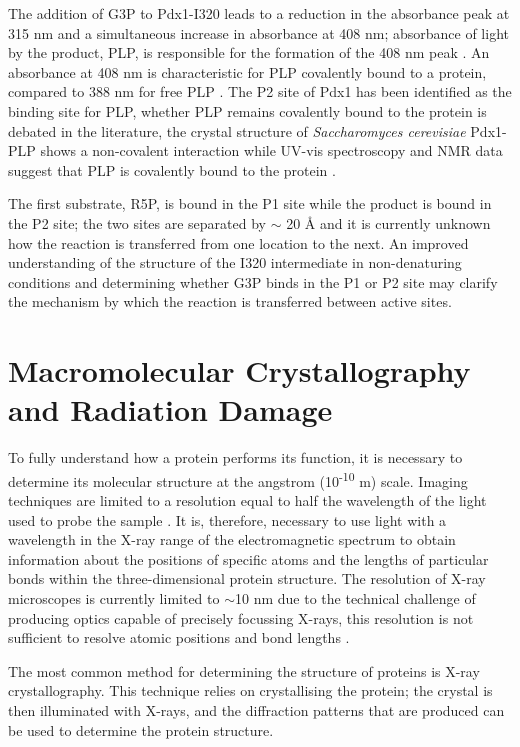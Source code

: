 The addition of G3P to Pdx1-I320 leads to a reduction in the absorbance peak at 315 nm and a simultaneous increase in absorbance at 408 nm; absorbance of light by the product, PLP, is responsible for the formation of the 408 nm peak \cite{Hanes2008b}. An absorbance at 408 nm is characteristic for PLP covalently bound to a protein, compared to 388 nm for free PLP \cite{Hanes2008b}. The P2 site of Pdx1 has been identified as the binding site for PLP, whether PLP remains covalently bound to the protein is debated in the literature, the crystal structure of \textit{Saccharomyces cerevisiae} Pdx1-PLP shows a non-covalent interaction while UV-vis spectroscopy and NMR data suggest that PLP is covalently bound to the protein \cite{Hanes2008b,Zhang2010}. 

The first substrate, R5P, is bound in the P1 site while the product is bound in the P2 site; the two sites are separated by $\sim$ 20 \si{\angstrom} and it is currently unknown how the reaction is transferred from one location to the next. An improved understanding of the structure of the I320 intermediate in non-denaturing conditions and determining whether G3P binds in the P1 or P2 site may clarify the mechanism by which the reaction is transferred between active sites.        

\cleardoublepage
\section{Macromolecular Crystallography and Radiation Damage}

To fully understand how a protein performs its function, it is necessary to determine its molecular structure at the angstrom (10\textsuperscript{-10} \si{\metre}) scale. Imaging techniques are limited to a resolution equal to half the wavelength of the light used to probe the sample \cite{Abbe1873}. It is, therefore, necessary to use light with a wavelength in the X-ray range of the electromagnetic spectrum to obtain information about the positions of specific atoms and the lengths of particular bonds within the three-dimensional protein structure. The resolution of X-ray microscopes is currently limited to $\sim$10 nm due to the technical challenge of producing optics capable of precisely focussing X-rays, this resolution is not sufficient to resolve atomic positions and bond lengths \cite{Schropp2012}. 

The most common method for determining the structure of proteins is X-ray crystallography. This technique relies on crystallising the protein; the crystal is then illuminated with X-rays, and the diffraction patterns that are produced can be used to determine the protein structure.  

